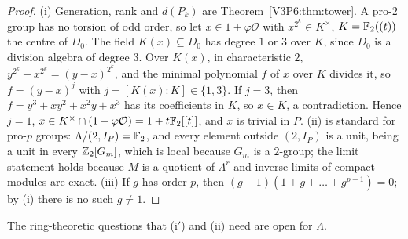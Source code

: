 \begin{proof}
(i) Generation, rank and $d(P_k)$ are Theorem~\ref{V3P6:thm:tower}. A pro-$2$ group has no
torsion of odd order, so let $x\in1+\varphi\mathcal O$ with $x^{2^{k}}\in K^{\times}$,
$K=\mathbb{F}_2((t))$ the centre of $D_0$. The field $K(x)\subseteq D_0$ has degree $1$ or $3$ over $K$,
since $D_0$ is a division algebra of degree $3$. Over $K(x)$, in characteristic $2$, $y^{2^{k}}-x^{2^{k}}=(y-x)^{2^{k}}$, and the minimal
polynomial $f$ of $x$ over $K$ divides it, so $f=(y-x)^{j}$ with $j=[K(x):K]\in\{1,3\}$. If $j=3$,
then $f=y^{3}+xy^{2}+x^{2}y+x^{3}$ has its coefficients in $K$, so $x\in K$, a contradiction.
Hence $j=1$, $x\in K^{\times}\cap(1+\varphi\mathcal O)=1+t\mathbb{F}_2[[t]]$, and $x$ is
trivial in $P$. (ii) is standard for pro-$p$ groups: $\Lambda/(2,I_P)=\mathbb{F}_2$, and every element
outside $(2,I_P)$ is a unit, being a unit in every $\mathbb{Z}_2[G_m]$, which is local because $G_m$ is
a $2$-group; the limit statement holds because $M$ is a quotient of $\Lambda^{r}$ and inverse
limits of compact modules are exact. (iii) If $g$ has order $p$, then
$(g-1)(1+g+\dots+g^{p-1})=0$; by (i) there is no such $g\ne1$.
\end{proof}

The ring-theoretic questions that (i$'$) and (ii) need are open for $\Lambda$.

